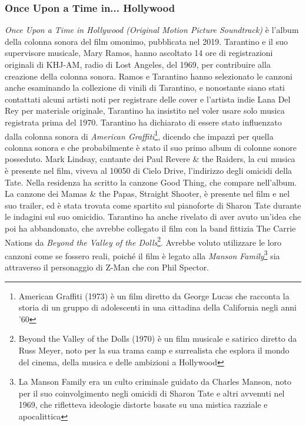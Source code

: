 \documentclass[12pt]{article} %
\begin{document}
                            \subsubsection*{Once Upon a Time in... Hollywood}
                            \begin{flushleft}
                                \textit{Once Upon a Time in Hollywood (Original Motion Picture Soundtrack)} è l'album della colonna sonora del film omonimo, pubblicata nel 2019. Tarantino e il suo supervisore musicale, Mary Ramos, hanno ascoltato 14 ore di registrazioni originali di KHJ-AM, radio di Lost Angeles, del 1969, per contribuire alla creazione della colonna sonora.
                                Ramos e Tarantino hanno selezionato le canzoni anche esaminando la collezione di vinili di Tarantino, e nonostante siano stati contattati alcuni artisti noti per registrare delle cover e l'artista indie Lana Del Rey per materiale originale, Tarantino ha insistito nel voler usare solo musica registrata prima del 1970.
                                Tarantino ha dichiarato di essere stato influenzato dalla colonna sonora di \textit{American Graffiti}\footnote{American Graffiti (1973) è un film diretto da George Lucas che racconta la storia di un gruppo di adolescenti in una cittadina della California negli anni '60}, dicendo che impazzì per quella colonna sonora e che probabilmente è stato il suo primo album di colonne sonore posseduto. 
                                Mark Lindsay, cantante dei Paul Revere \& the Raiders, la cui musica è presente nel film, viveva al 10050 di Cielo Drive, l'indirizzo degli omicidi della Tate. Nella residenza ha scritto la canzone Good Thing, che compare nell'album. 
                                La canzone dei Mamas \& the Papas, Straight Shooter, è presente nel film e nel suo trailer, ed è stata trovata come spartito sul pianoforte di Sharon Tate durante le indagini sul suo omicidio.
                                Tarantino ha anche rivelato di aver avuto un'idea che poi ha abbandonato, che avrebbe collegato il film con la band fittizia The Carrie Nations da \textit{Beyond the Valley of the Dolls}\footnote{Beyond the Valley of the Dolls (1970) è un film musicale e satirico diretto da Russ Meyer, noto per la sua trama camp e surrealista che esplora il mondo del cinema, della musica e delle ambizioni a Hollywood}. Avrebbe voluto utilizzare le loro canzoni come se fossero reali, poiché il film è legato alla \textit{Manson Family}\footnote{La Manson Family era un culto criminale guidato da Charles Manson, noto per il suo coinvolgimento negli omicidi di Sharon Tate e altri avvenuti nel 1969, che rifletteva ideologie distorte basate su una mistica razziale e apocalittica} sia attraverso il personaggio di Z-Man che con Phil Spector.
                            \end{flushleft}
\end{document}
